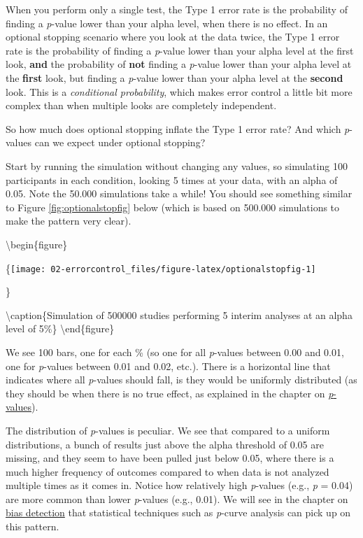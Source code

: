 \documentclass[
  oneside]{book}
\begin{document}
When you perform only a single test, the Type 1 error rate is the probability of finding a \emph{p}-value lower than your alpha level, when there is no effect. In an optional stopping scenario where you look at the data twice, the Type 1 error rate is the probability of finding a \emph{p}-value lower than your alpha level at the first look, \textbf{and} the probability of \textbf{not} finding a \emph{p}-value lower than your alpha level at the \textbf{first} look, but finding a \emph{p}-value lower than your alpha level at the \textbf{second} look. This is a \emph{conditional probability}, which makes error control a little bit more complex than when multiple looks are completely independent.

So how much does optional stopping inflate the Type 1 error rate? And which \emph{p}-values can we expect under optional stopping?

Start by running the simulation without changing any values, so simulating 100 participants in each condition, looking 5 times at your data, with an alpha of 0.05. Note the 50.000 simulations take a while! You should see something similar to Figure \ref{fig:optionalstopfig} below (which is based on 500.000 simulations to make the pattern very clear).

\textbackslash begin\{figure\}

\{\centering \texttt{[image: 02-errorcontrol\_files/figure-latex/optionalstopfig-1]}

\}

\textbackslash caption\{Simulation of 500000 studies performing 5 interim analyses at an alpha level of 5\%\}\label{fig:optionalstopfig}
\textbackslash end\{figure\}

We see 100 bars, one for each \% (so one for all \emph{p}-values between 0.00 and 0.01, one for \emph{p}-values between 0.01 and 0.02, etc.). There is a horizontal line that indicates where all \emph{p}-values should fall, is they would be uniformly distributed (as they should be when there is no true effect, as explained in the chapter on \protect\hyperlink{pvalues}{\emph{p}-values}).

The distribution of \emph{p}-values is peculiar. We see that compared to a uniform distributions, a bunch of results just above the alpha threshold of 0.05 are missing, and they seem to have been pulled just below 0.05, where there is a much higher frequency of outcomes compared to when data is not analyzed multiple times as it comes in. Notice how relatively high \emph{p}-values (e.g., \emph{p} = 0.04) are more common than lower \emph{p}-values (e.g., 0.01). We will see in the chapter on \href{bias}{bias detection} that statistical techniques such as \emph{p}-curve analysis can pick up on this pattern.
\end{document}
